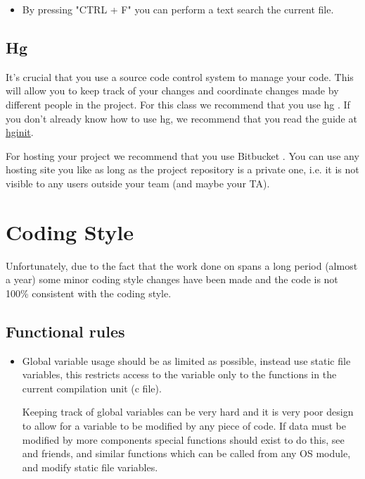 \begin{appendices}
\begin{itemize}
	\item By pressing "CTRL + F" you can perform a text search the current file.

\end{itemize}

\section{Hg}

It's crucial that you use a source code control system to manage your \projectname code. This will
allow you to keep track of your changes and coordinate changes made by different people in the 
project. For this class we recommend that you use hg \cite{tortoiseHg}. If you don’t
already know how to use hg, we recommend that you read the guide at \href{http://hginit.com/}{hginit}.

For hosting your project we recommend that you use Bitbucket \cite{bitbucket}. You can use any 
hosting site you like as long as the project repository is a private one, i.e. it is not visible to
any users outside your team (and maybe your TA).

\chapter{Coding Style}

Unfortunately, due to the fact that the work done on \projectname spans a long period (almost a
year) some minor coding style changes have been made and the code is not 100\% consistent with the
coding style.

\section{Functional rules}
\begin{itemize}
	\item Global variable usage should be as limited as possible, instead use static file variables,
this restricts access to the variable only to the functions in the current compilation unit (c file).

	Keeping track of global variables can be very hard and it is very poor design to allow for a
variable to be modified by any piece of code. If data must be modified by more components special
functions should exist to do this, see  and friends, 
and similar functions which can be called from any OS module, and modify static file variables.


\end{itemize}
\end{appendices}
